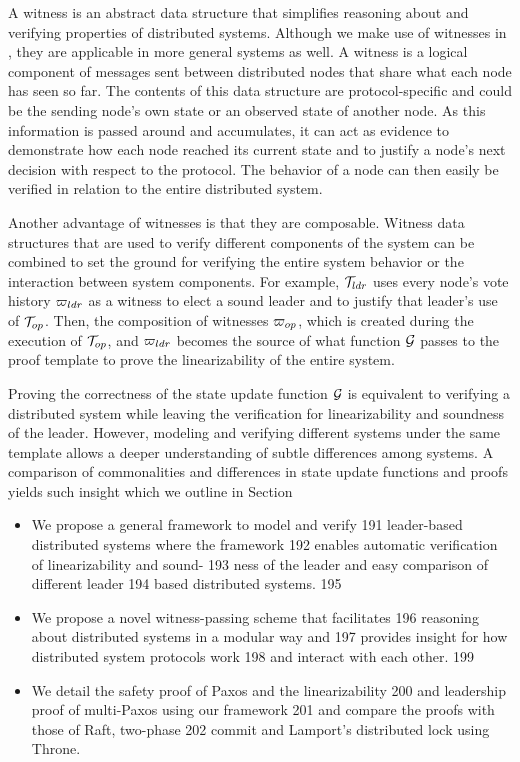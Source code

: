 A witness is an abstract data structure that simplifies reasoning about and
verifying properties of distributed systems. Although we make use of witnesses
in \sysname{}, they are applicable in more general systems as well. A witness is
a logical component of messages sent between distributed nodes that share what
each node has seen so far. The contents of this data structure are
protocol-specific and could be the sending node's own state or an observed state
of another node. As this information is passed around and accumulates, it can
act as evidence to demonstrate how each node reached its current state and to
justify a node's next decision with respect to the protocol. The behavior of a
node can then easily be verified in relation to the entire distributed system.

Another advantage of witnesses is that they are composable. Witness data
structures that are used to verify different components of the system can be
combined to set the ground for verifying the entire system behavior or the
interaction between system components. For example, $\mathcal{T}_{ldr}$ uses every
node's vote history ${\varpi_{ldr}}$ as a witness to elect a sound leader and to
justify that leader's use of $\mathcal{T}_{op}$. Then, the composition of witnesses
${\varpi_{op}}$, which is created during the execution of $\mathcal{T}_{op}$, and
${\varpi_{ldr}}$ becomes the source of what function $\mathcal{G}$ passes to
the proof template to prove the linearizability of the entire system.


Proving the correctness of the state update function $\mathcal{G}$ is equivalent to
verifying a distributed system while leaving the verification for linearizability
and soundness of the leader. However, modeling and verifying different systems
under the same template allows a deeper understanding of subtle differences among systems.
A comparison of commonalities and differences in state update functions
and proofs yields such insight which we outline in Section


\begin{itemize}
\item We propose a general framework to model and verify 191
leader-based distributed systems where the framework 192 enables automatic verification of linearizability and sound- 193 ness of the leader and easy comparison of different leader 194 based distributed systems. 195
\item We propose a novel witness-passing scheme that facilitates 196 reasoning about distributed systems in a modular way and 197 provides insight for how distributed system protocols work 198 and interact with each other. 199
\item We detail the safety proof of Paxos and the linearizability 200 and leadership proof of multi-Paxos using our framework 201 and compare the proofs with those of Raft, two-phase 202 commit and Lamport’s distributed lock using Throne.
\end{itemize}


